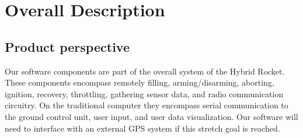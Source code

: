 \documentclass[10pt,draftclsnofoot,onecolumn,retainorgcmds]{IEEEtran}
\begin{document}
\section{ Overall Description}
\subsection{ Product perspective}
Our software components are part of the overall system of the Hybrid Rocket. These components encompass remotely filling, arming/disarming, aborting, ignition, recovery, throttling, gathering sensor data, and radio communication circuitry.  On the traditional computer they encompass serial communication to the ground control unit, user input, and user data visualization. Our software will need to interface with an external GPS system if this stretch goal is reached. 
\end{document}
